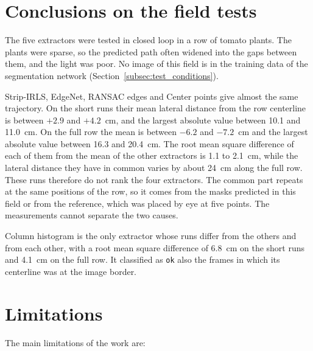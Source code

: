 \section{Conclusions on the field tests}
\label{sec:field_conclusions}

The five extractors were tested in closed loop in a row of tomato plants. The plants were sparse, so the predicted path often widened into the gaps between them, and the light was poor. No image of this field is in the training data of the segmentation network (Section~\ref{subsec:test_conditions}).

Strip-IRLS, EdgeNet, RANSAC edges and Center points give almost the same trajectory. On the short runs their mean lateral distance from the row centerline is between $+2.9$ and $+4.2$~cm, and the largest absolute value between 10.1 and 11.0~cm. On the full row the mean is between $-6.2$ and $-7.2$~cm and the largest absolute value between 16.3 and 20.4~cm. The root mean square difference of each of them from the mean of the other extractors is 1.1 to 2.1~cm, while the lateral distance they have in common varies by about 24~cm along the full row. These runs therefore do not rank the four extractors. The common part repeats at the same positions of the row, so it comes from the masks predicted in this field or from the reference, which was placed by eye at five points. The measurements cannot separate the two causes.

Column histogram is the only extractor whose runs differ from the others and from each other, with a root mean square difference of 6.8~cm on the short runs and 4.1~cm on the full row. It classified as \texttt{ok} also the frames in which its centerline was at the image border.

\section{Limitations}
\label{sec:limitations}

The main limitations of the work are:


